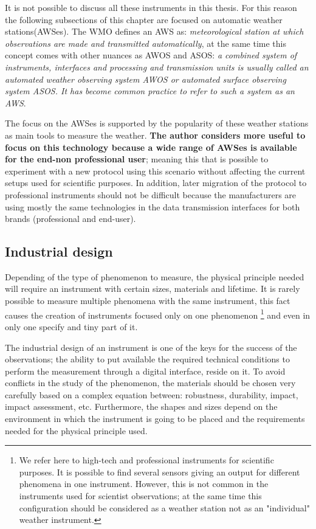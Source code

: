 It is not possible to discuss all these instruments in this thesis. For this reason the following subsections of this chapter are focused on automatic weather stations(\gls{AWS}es). The \gls{WMO} defines an \gls{AWS} as: \emph{meteorological station at which observations are made and transmitted automatically}\cite{GMIMO}, at the same time this concept comes with other nuances as \gls{AWOS} and \gls {ASOS}: \emph{a combined system of instruments, interfaces and processing and transmission units is usually called an automated weather observing system \gls {AWOS} or automated surface observing system \gls {ASOS}. It has become common practice to refer to such a system as an \gls{AWS}}.

The focus on the \gls{AWS}es is supported by the popularity of these weather stations as main tools to measure the weather. \textbf{The author considers more useful to focus on this technology because a wide range of \gls{AWS}es is available for the end-non professional user}; meaning this that is possible to experiment with a new protocol using this scenario without affecting the current setups used for scientific purposes. In addition, later migration of the protocol to professional instruments should not be difficult because the manufacturers are using mostly the same technologies in the data transmission interfaces for both brands (professional and end-user).

\subsection{Industrial design}

Depending of the type of phenomenon to measure, the physical principle needed will require an instrument with certain sizes, materials and lifetime. It is rarely possible to measure multiple phenomena with the same instrument, this fact causes the creation of instruments focused only on one phenomenon \footnote{We refer here to high-tech and professional instruments for scientific purposes. It is possible to find several sensors giving an output for different phenomena in one instrument. However, this is not common in the instruments used for scientist observations; at the same time this configuration should be considered as a weather station not  as an "individual" weather instrument.} and even in only one specify and tiny part of it. 

The industrial design of an instrument is one of the keys for the success of the observations; the ability to put available the required technical conditions to perform the measurement through a digital interface, reside on it. To avoid conflicts in the study of the phenomenon, the materials should be chosen very carefully based on a complex equation between: robustness, durability, impact, impact assessment, etc. Furthermore, the shapes and sizes depend on the environment in which the instrument is going to be placed and the requirements needed for the physical principle used.

